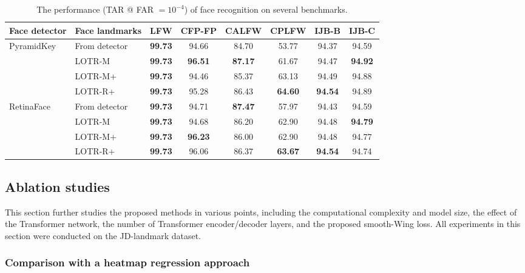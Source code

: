\documentclass[journal]{IEEEtran}
\begin{document}
\begin{table*}
\caption{The performance (TAR @ FAR $=10^{-4}$) of face recognition on several benchmarks.}
\centering
\begin{tabular}{llcccccc}
\hline
Face detector    & Face landmarks    & LFW   & CFP-FP & CALFW & CPLFW & IJB-B & IJB-C   \\
\hline
PyramidKey       & From detector       & \textbf{99.73} & 94.66  & 84.70 & 53.77 & 94.37 & 94.59   \\
\cite{earp2019} & LOTR-M  & \textbf{99.73} & \textbf{96.51}  & \textbf{87.17} & 61.67 & 94.47 & \textbf{94.92}   \\
                 & LOTR-M+ & \textbf{99.73} & 94.46  & 85.37 & 63.13 & 94.49 & 94.88   \\
                 & LOTR-R+ & \textbf{99.73} & 95.28  & 86.43 & \textbf{64.60} & \textbf{94.54} & 94.89   \\
\hline
RetinaFace       & From detector       & \textbf{99.73} & 94.71  & \textbf{87.47} & 57.97 & 94.43 & 94.59   \\
\cite{deng2019} & LOTR-M  & \textbf{99.73} & 94.68  & 86.20 & 62.90 & 94.48 & \textbf{94.79}   \\
                 & LOTR-M+ & \textbf{99.73} & \textbf{96.23}  & 86.00 & 62.90 & 94.48 & 94.77   \\
                 & LOTR-R+ & \textbf{99.73} & 96.06  & 86.37 & \textbf{63.67} & \textbf{94.54} & 94.74   \\
\hline
\end{tabular}
\par
\label{tab:face_rec}
\end{table*}    


\subsection{Ablation studies}\label{subsec:ablation}

This section further studies the proposed methods in various points, including the computational complexity and model size, the effect of the Transformer network, the number of Transformer encoder/decoder layers, and the proposed smooth-Wing loss. 
All experiments in this section were conducted on the JD-landmark dataset.
\subsubsection{Comparison with a heatmap regression approach}\label{subsubsec:time}
\end{document}
